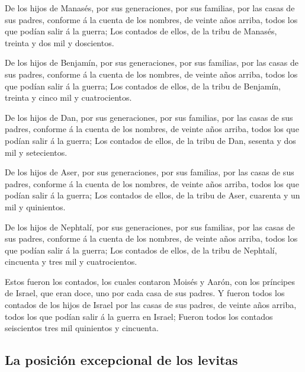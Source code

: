  De los hijos de Manasés, por sus generaciones, por sus
familias, por las casas de sus padres, conforme á la cuenta de los
nombres, de veinte años arriba, todos los que podían salir á la guerra;
 Los contados de ellos, de la tribu de Manasés, treinta y
dos mil y doscientos.

 De los hijos de Benjamín, por sus generaciones, por sus
familias, por las casas de sus padres, conforme á la cuenta de los
nombres, de veinte años arriba, todos los que podían salir á la guerra;
 Los contados de ellos, de la tribu de Benjamín, treinta y
cinco mil y cuatrocientos.

 De los hijos de Dan, por sus generaciones, por sus
familias, por las casas de sus padres, conforme á la cuenta de los
nombres, de veinte años arriba, todos los que podían salir á la guerra;
 Los contados de ellos, de la tribu de Dan, sesenta y dos
mil y setecientos.

 De los hijos de Aser, por sus generaciones, por sus
familias, por las casas de sus padres, conforme á la cuenta de los
nombres, de veinte años arriba, todos los que podían salir á la guerra;
 Los contados de ellos, de la tribu de Aser, cuarenta y un
mil y quinientos.

 De los hijos de Nephtalí, por sus generaciones, por sus
familias, por las casas de sus padres, conforme á la cuenta de los
nombres, de veinte años arriba, todos los que podían salir á la guerra;
 Los contados de ellos, de la tribu de Nephtalí, cincuenta
y tres mil y cuatrocientos.

 Estos fueron los contados, los cuales contaron Moisés y
Aarón, con los príncipes de Israel, que eran doce, uno por cada casa de
sus padres.  Y fueron todos los contados de los hijos de
Israel por las casas de sus padres, de veinte años arriba, todos los que
podían salir á la guerra en Israel;  Fueron todos los
contados seiscientos tres mil quinientos y cincuenta.

\hypertarget{la-posiciuxf3n-excepcional-de-los-levitas}{%
\subsection{La posición excepcional de los
levitas}\label{la-posiciuxf3n-excepcional-de-los-levitas}}

